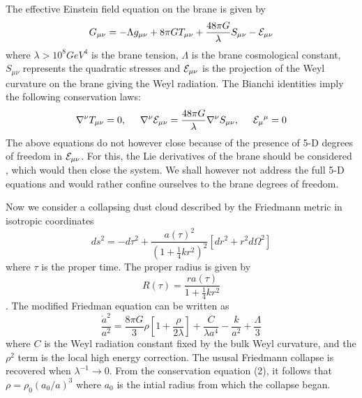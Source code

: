 \documentclass[a4paper,twocolumn,showpacs,preprintnumbers,amsmath,amssymb]{revtex4}
\begin{document}
The effective Einstein field equation on the brane is given by \cite{r2}
\begin{equation} 
G_{\mu\nu} = -\Lambda g_{\mu\nu} + 8\pi GT_{\mu\nu} + \frac{48\pi G}{\lambda}S_{\mu\nu} - {\cal E}_{\mu\nu}\label{01}\end{equation}
where $\lambda > 10^8 GeV^4$ is the brane tension, $\Lambda$ is the brane
cosmological constant, $S_{\mu\nu}$ represents the quadratic stresses and
$\cal E_{\mu\nu}$ is the projection of the Weyl curvature on the brane
giving the Weyl radiation. The Bianchi identities imply the following
conservation laws:
\begin{equation}\nabla^{\nu}T_{\mu\nu} = 0, \hspace{5mm} \nabla^{\nu}{\cal E}_{\mu\nu} = \frac{48\pi G}{\lambda}\nabla^{\nu}S_{\mu\nu}
, \hspace{5mm} {\cal E}_{\mu}{}^{\mu} = 0\end{equation}
The above equations do not however close because of the presence of 5-D
degrees of freedom in $\cal E_{\mu\nu}$. For this, the Lie derivatives of
the brane should be considered \cite{r2}, which would then close the system. We
shall however not address the full 5-D equations and would rather
confine ourselves to the brane degrees of freedom.



Now we consider a collapsing dust cloud described by the Friedmann metric in 
isotropic coordinates
\begin{equation} \label{1}
ds^2 = -d\tau^2 + \frac{a(\tau)^2}{(1 + \mbox{$\frac{1}{4}$}kr^2)^2}\left[dr^2 + r^2 d\Omega^2\right]\end{equation}
where $\tau$ is the proper time. 
The proper radius is given by 
\[R(\tau) = \frac{ra(\tau)}{1 + \mbox{$\frac{1}{4}$}kr^2}\]. 
The modified Friedman equation can be written as
\begin{equation} \label{2}
\frac{{\dot a}^2}{a^2} = \frac{8\pi G}{3}\rho\left[1 + \frac{\rho}{2\lambda}\right] + \frac{C}{\lambda a^4} - \frac{k}{a^2} + \frac{\Lambda}{3}\end{equation}
where $C$ is the Weyl radiation constant fixed by the bulk Weyl curvature, and the ${\rho}^2$ term is the local high energy correction. The ususal Friedmann 
collapse is recovered when $\lambda^{-1}\rightarrow 0$. From the conservation
equation (2), it follows that $\rho= \rho_0(a_0/a)^3$ where $a_0$ is the 
intial radius from which the collapse began. 
\end{document}
